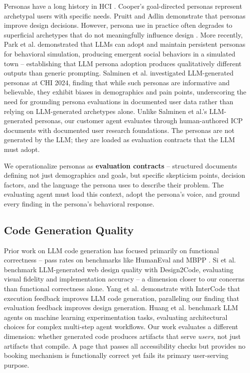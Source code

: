 \documentclass[conference]{IEEEtran}
\begin{document}
Personas have a long history in HCI \cite{grudin2002personas, nielsen2019personas, matthews2012personas}. Cooper's goal-directed personas \cite{cooper1999inmates} represent archetypal users with specific needs. Pruitt and Adlin \cite{pruitt2006persona} demonstrate that personas improve design decisions. However, persona use in practice often degrades to superficial archetypes that do not meaningfully influence design \cite{long2009personas}. More recently, Park et al. \cite{park2023generative} demonstrated that LLMs can adopt and maintain persistent personas for behavioral simulation, producing emergent social behaviors in a simulated town -- establishing that LLM persona adoption produces qualitatively different outputs than generic prompting. Salminen et al. \cite{salminen2024personas} investigated LLM-generated personas at CHI 2024, finding that while such personas are informative and believable, they exhibit biases in demographics and pain points, underscoring the need for grounding persona evaluations in documented user data rather than relying on LLM-generated archetypes alone. Unlike Salminen et al.'s LLM-generated personas, our customer agent evaluates through human-authored ICP documents with documented user research foundations. The personas are not generated by the LLM; they are loaded as evaluation contracts that the LLM must adopt.

We operationalize personas as \textbf{evaluation contracts} -- structured documents defining not just demographics and goals, but specific skepticism points, decision factors, and the language the persona uses to describe their problem. The evaluating agent must load this context, adopt the persona's voice, and ground every finding in the persona's behavioral response.

\subsection{Code Generation Quality}\label{code-generation-quality}

Prior work on LLM code generation has focused primarily on functional correctness -- pass rates on benchmarks like HumanEval \cite{chen2021humaneval} and MBPP \cite{austin2021program}. Si et al. \cite{si2025design2code} benchmark LLM-generated web design quality with Design2Code, evaluating visual fidelity and implementation accuracy -- a dimension closer to our concerns than functional correctness alone. Yang et al. \cite{yang2023intercode} demonstrate with InterCode that execution feedback improves LLM code generation, paralleling our finding that evaluation feedback improves design generation. Huang et al. \cite{huang2024mlagentbench} benchmark LLM agents on machine learning experimentation tasks, evaluating architectural choices for complex multi-step agent workflows. Our work evaluates a different dimension: whether generated code produces artifacts that serve \emph{users}, not just artifacts that compile. A page that passes all accessibility checks but provides no booking mechanism is functionally correct yet fails its primary user-serving purpose.
\end{document}
